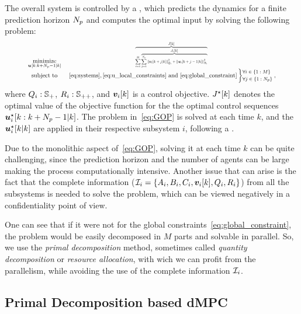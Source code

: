 \documentclass{ifacconf}  %
\begin{document}
The overall system is controlled by a \mpc{}, which predicts the dynamics for a finite prediction horizon $N_{p}$ and computes the optimal input by solving the following problem:
\begin{equation}\label{eq:GOP}
\resizebox{.88\columnwidth}{!}{$
\begin{matrix}
\underset{\useq}{\mathrm{minimize}}&\resizebox{0.35\textwidth}{!}{$\overbrace{\sum\limits^{M}_{i=1} \overbrace{\sum_{j=1}^{\predhorz} \norm{\mpcvec{v}[i][k+j][k]}^{2}_{Q_i}+\norm{\mpcvec{u}[i][k+j-1][k]}^{2}_{R_i}}^{\textstyle{} \obji}}^{\textstyle{} \globobj}$}\\
\mathrm{subject~ to}&~\eqref{eq:systems},\eqref{eq:u_local_constraints}\ \mathrm{and}\ \eqref{eq:global_constraint}
\left\}\small
\begin{aligned}
  &\forall i\in \{1:\nsubsystems\}\\
  &\forall j\in \{1:\predhorz\}
\end{aligned}\right.,

\end{matrix}
  $}
\end{equation}
where ${Q_{i}:\mathbb{S}_{+}}$, ${R_{i}:\mathbb{S}_{++}}$, and $\vik$ is a control objective.
$\optglobobj$ denotes the optimal value of the objective function for the the optimal control sequences ${\optuiseq}$.
The problem in~\eqref{eq:GOP} is solved at each time $k$, and the ${\optuikk}$ are applied in their respective subsystem $i$, following a \rhs{}.

Due to the monolithic aspect of~\eqref{eq:GOP}, solving it at each time $k$ can be quite challenging, since the prediction horizon and the number of agents can be large making the process computationally intensive. Another issue that can arise is the fact that the complete information (${\mathcal{I}_{i}=\{A_{i},B_{i},C_{i},\boldsymbol{v}_{i}[k],Q_{i},R_{i}\}}$) from all the subsystems is needed to solve the problem,
which can be viewed negatively in a confidentiality point of view.

One can see that if it were not for the global constraints~\eqref{eq:global_constraint}, the problem would be easily decomposed in $M$ parts and solvable in parallel.
So, we use the \emph{primal decomposition} method, sometimes called \emph{quantity decomposition} or \emph{resource allocation}, with wich we can profit from the parallelism, while avoiding the use of the complete information $\mathcal{I}_{i}$.

\subsection{Primal Decomposition based dMPC}\label{ssec:dMPC}
\end{document}
